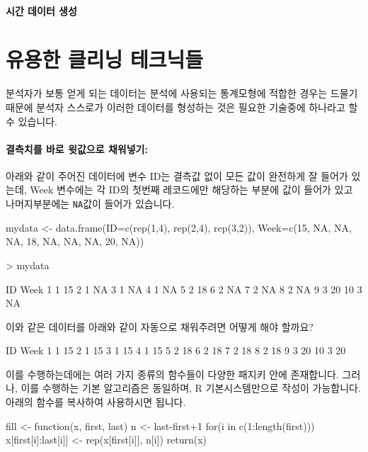 \documentclass{report}
\begin{document}
\paragraph{시간 데이터 생성}


\section{유용한 클리닝 테크닉들}

분석자가 보통 얻게 되는 데이터는 분석에 사용되는 통계모형에 적합한 경우는 드물기 때문에 분석자 스스로가 이러한 데이터를 형성하는 것은 필요한 기술중에 하나라고 할 수 있습니다.
% 

\paragraph{결측치를 바로 윗값으로 채워넣기: } 아래와 같이 주어진 데이터에 변수 ID는 결측값 없이 모든 값이 완전하게 잘 들어가 있는데, Week 변수에는 각 ID의 첫번째 레코드에만 해당하는 부분에 값이 들어가 있고 나머지부분에는 \texttt{NA}값이 들어가 있습니다. 

\begin{Schunk}
\begin{Soutput}
mydata <- data.frame(ID=c(rep(1,4), rep(2,4), rep(3,2)), Week=c(15, NA, NA, NA, 18, NA, NA, NA, 20, NA))

> mydata		

   ID Week
1   1   15
2   1   NA
3   1   NA
4   1   NA
5   2   18
6   2   NA
7   2   NA
8   2   NA
9   3   20
10  3   NA
\end{Soutput}
\end{Schunk}

이와 같은 데이터를 아래와 같이 자동으로 채워주려면 어떻게 해야 할까요? 	
	
\begin{Schunk}
\begin{Soutput}
   ID Week
1   1   15
2   1   15
3   1   15
4   1   15
5   2   18
6   2   18
7   2   18
8   2   18
9   3   20
10  3   20
\end{Soutput}
\end{Schunk}
	

이를 수행하는데에는 여러 가지 종류의 함수들이 다양한 패지키 안에 존재합니다.  
그러나, 이를 수행하는 기본 알고리즘은 동일하며, R 기본시스템만으로 작성이 가능합니다. 
아래의 함수를 복사하여 사용하시면 됩니다. 

\begin{Schunk}
	\begin{Soutput}
fill <- function(x, first, last){
	n <- last-first+1
	for(i in c(1:length(first))) x[first[i]:last[i]] <- rep(x[first[i]], n[i])
	return(x)
}
	\end{Soutput}
\end{Schunk}
\end{document}
